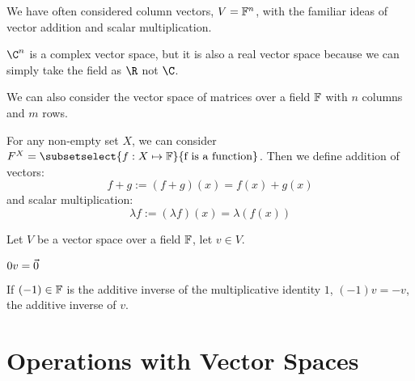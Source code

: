 \documentclass[../Main.tex]{subfiles}
\begin{document}
\begin{example}
    We have often considered column vectors, $V = \mathbb{F}^n$, with the familiar ideas of vector addition and scalar multiplication.

    $\C^n$ is a complex vector space, but it is also a real vector space because we can simply take the field as $\R$ not $\C$.
\end{example}
\begin{example}
    We can also consider the vector space of matrices over a field $\mathbb{F}$ with $n$ columns and $m$ rows.
\end{example}
\begin{example}
    For any non-empty set $X$, we can consider $F^X = \subsetselect{f : X \mapsto \F}{\text{f is a function}}$. Then we define addition of vectors:
    \begin{equation*}
        f+g := (f + g)(x) = f(x) + g(x)
    \end{equation*}
    and scalar multiplication:
    \begin{equation*}
        \lambda f := (\lambda f)(x) = \lambda (f(x))
    \end{equation*}
\end{example}
\begin{propositions}{
        Let $V$ be a vector space over a field $\mathbb{F}$, let $v \in V$.
    }
    \item $0v = \vec{0}$ \label{propZeroVector}
    \item If $(-1) \in \mathbb{F}$ is the additive inverse of the multiplicative identity $1$, $(-1)v = -v$, the additive inverse of $v$. \label{propNegativeVector}
    \label{propsSpecialVectors}
\end{propositions}
\section{Operations with Vector Spaces}
\end{document}

